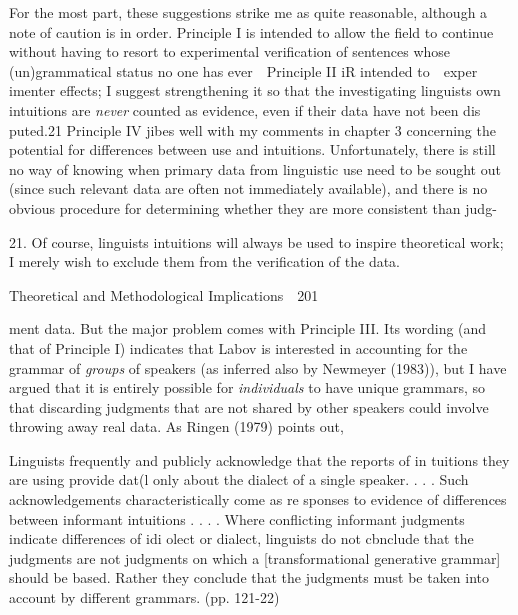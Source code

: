 \begin{styleStandard}
For the most part, these suggestions strike me as quite reasonable, although a note of caution is in order. Principle I is intended to allow the field to continue without having to resort to experimental verification of sentences whose (un)grammatical status no one has ever\ \ Principle II iR intended to\ \ exper imenter effects; I suggest strengthening it so that the investigating linguists{\textquotesingle} own intuitions are \textit{never}\textit{ }counted as evidence, even if their data have not been dis\- puted.21 Principle IV jibes well with my comments in chapter 3 concerning the potential for differences between use and intuitions. Unfortunately, there is still no way of knowing when primary data from linguistic use need to be sought out (since such relevant data are often not immediately available), and there is no obvious procedure for determining whether they are more consistent than judg-
\end{styleStandard}


\begin{styleStandard}
21. Of course, linguists{\textquotesingle} intuitions will always be used to inspire theoretical work; I merely wish to exclude them from the verification of the data.
\end{styleStandard}


\clearpage\setcounter{page}{1}\begin{styleStandard}
Theoretical and Methodological Implications\ \ 201
\end{styleStandard}


\begin{styleTextbody}
ment data. But the major problem comes with Principle III. Its wording (and that of Principle I) indicates that Labov is interested in accounting for the grammar of \textit{groups}\textit{ }of speakers (as inferred also by Newmeyer (1983)), but I have argued that it is entirely possible for \textit{individuals}\textit{ }to have unique grammars, so that discarding judgments that are not shared by other speakers could involve throwing away real data. As Ringen (1979) points out,
\end{styleTextbody}


\begin{styleTextbody}
Linguists frequently and publicly acknowledge that the reports of in\- tuitions they are using provide dat(l only about the dialect of a single speaker. . . . Such acknowledgements characteristically come as re\- sponses to evidence of differences between informant intuitions . . . . Where conflicting informant judgments indicate differences of idi\- olect or dialect, linguists do not cbnclude that the judgments are not judgments on which a [transformational generative grammar] should be based. Rather they conclude that the judgments must be taken into account by different grammars. (pp. 121-22)
\end{styleTextbody}


